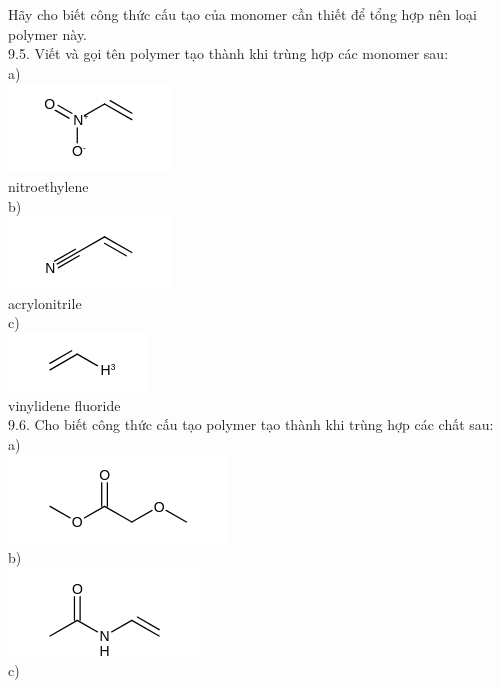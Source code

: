 \documentclass[10pt]{article}
\begin{document}
Hãy cho biết công thức cấu tạo của monomer cần thiết để tổng hợp nên loại polymer này.\\
9.5. Viết và gọi tên polymer tạo thành khi trùng hợp các monomer sau:\\
a)\\
\includegraphics{smile-dc0cc52433bfbf1405f805a601e32c21059460df}\\
nitroethylene\\
b)\\
\includegraphics{smile-e72e474af6571dde5759c29e0d5e9fcddb769efd}\\
acrylonitrile\\
c)\\
\includegraphics{smile-b7d27e2e283f3400fbf5fa5d55d413b49511b413}\\
vinylidene fluoride\\
9.6. Cho biết công thức cấu tạo polymer tạo thành khi trùng hợp các chất sau:\\
a)\\
\includegraphics{smile-95cf1d22419a9be9cd5d1025b64365e8613bd9d1}\\
b)\\
\includegraphics{smile-e0f60aed254a8ff7e6ba4b28468399bb264c8f14}\\
c)\\
\end{document}
